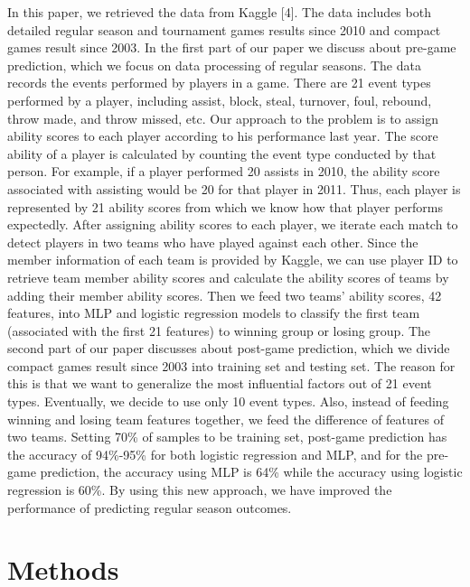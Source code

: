 \documentclass[12pt]{article}
\begin{document}
\quad In this paper, we retrieved the data from Kaggle [4]. The data includes both detailed regular season and tournament games results since 2010 and compact games result since 2003. In the first part of our paper we discuss about pre-game prediction, which we focus on data processing of regular seasons. The data records the events performed by players in a game. There are 21 event types performed by a player, including assist, block, steal, turnover, foul, rebound, throw made, and throw missed, etc. Our approach to the problem is to assign ability scores to each player according to his performance last year. The score ability of a player is calculated by counting the event type conducted by that person. For example, if a player performed 20 assists in 2010, the ability score associated with assisting would be 20 for that player in 2011. Thus, each player is represented by 21 ability scores from which we know how that player performs expectedly. After assigning ability scores to each player, we iterate each match to detect players in two teams who have played against each other. Since the member information of each team is provided by Kaggle, we can use player ID to retrieve team member ability scores and calculate the ability scores of teams by adding their member ability scores. Then we feed two teams' ability scores, 42 features, into MLP and logistic regression models to classify the first team (associated with the first 21 features) to winning group or losing group. The second part of our paper discusses about post-game prediction, which we divide compact games result since 2003 into training set and testing set. The reason for this is that we want to generalize the most influential factors out of 21 event types. Eventually, we decide to use only 10 event types. Also, instead of feeding winning and losing team features together, we feed the difference of features of two teams. Setting 70\% of samples to be training set, post-game prediction has the accuracy of 94\%-95\% for both logistic regression and MLP, and for the pre-game prediction, the accuracy using MLP is 64\% while the accuracy using logistic regression is 60\%. By using this new approach, we have improved the performance of predicting regular season outcomes.





\section{Methods}
\end{document}
